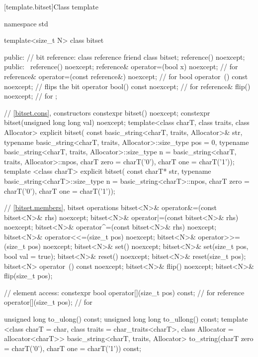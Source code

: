 [template.bitset]{Class template }%
%
\begin{codeblock}
namespace std {
  template<size_t N> class bitset {
  public:
    // bit reference:
    class reference {
      friend class bitset;
      reference() noexcept;
    public:
      ~reference() noexcept;
      reference& operator=(bool x) noexcept;             // for 
      reference& operator=(const reference&) noexcept;   // for 
      bool operator~() const noexcept;                   // flips the bit
      operator bool() const noexcept;                    // for 
      reference& flip() noexcept;                        // for 
    };

    // \ref{bitset.cons}, constructors
    constexpr bitset() noexcept;
    constexpr bitset(unsigned long long val) noexcept;
    template<class charT, class traits, class Allocator>
      explicit bitset(
        const basic_string<charT, traits, Allocator>& str,
        typename basic_string<charT, traits, Allocator>::size_type pos = 0,
        typename basic_string<charT, traits, Allocator>::size_type n =
          basic_string<charT, traits, Allocator>::npos,
        charT zero = charT('0'),
        charT one = charT('1'));
    template <class charT>
      explicit bitset(
        const charT* str,
        typename basic_string<charT>::size_type n = basic_string<charT>::npos,
        charT zero = charT('0'),
        charT one = charT('1'));

    // \ref{bitset.members}, bitset operations
    bitset<N>& operator&=(const bitset<N>& rhs) noexcept;
    bitset<N>& operator|=(const bitset<N>& rhs) noexcept;
    bitset<N>& operator^=(const bitset<N>& rhs) noexcept;
    bitset<N>& operator<<=(size_t pos) noexcept;
    bitset<N>& operator>>=(size_t pos) noexcept;
    bitset<N>& set() noexcept;
    bitset<N>& set(size_t pos, bool val = true);
    bitset<N>& reset() noexcept;
    bitset<N>& reset(size_t pos);
    bitset<N>  operator~() const noexcept;
    bitset<N>& flip() noexcept;
    bitset<N>& flip(size_t pos);

    // element access:
    constexpr bool operator[](size_t pos) const;       // for 
    reference operator[](size_t pos);                  // for 

    unsigned long to_ulong() const;
    unsigned long long to_ullong() const;
    template <class charT = char,
              class traits = char_traits<charT>,
              class Allocator = allocator<charT>>
      basic_string<charT, traits, Allocator>
        to_string(charT zero = charT('0'), charT one = charT('1')) const;

}}
\end{codeblock}
